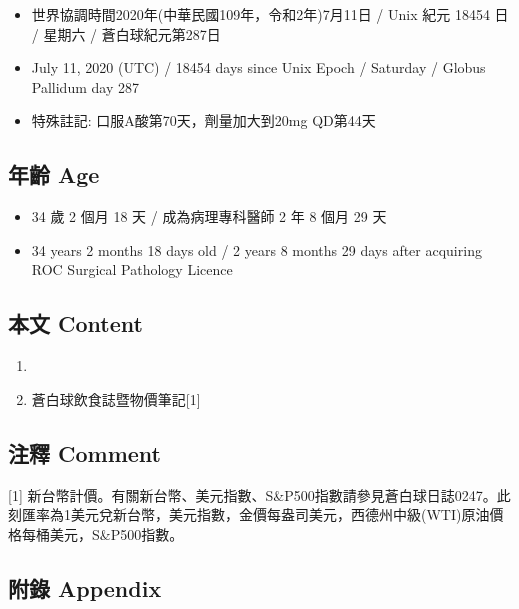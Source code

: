 \documentclass[
]{article}
\providecommand{\tightlist}{%
  \setlength{\itemsep}{0pt}\setlength{\parskip}{0pt}}
\begin{document}
\begin{itemize}
\tightlist
\item
  世界協調時間2020年(中華民國109年，令和2年)7月11日 / Unix 紀元 18454 日
  / 星期六 / 蒼白球紀元第287日
\item
  July 11, 2020 (UTC) / 18454 days since Unix Epoch / Saturday / Globus
  Pallidum day 287
\item
  特殊註記: 口服A酸第70天，劑量加大到20mg QD第44天
\end{itemize}

\hypertarget{ux5e74ux9f61-age-10}{%
\subsection{年齡 Age}\label{ux5e74ux9f61-age-10}}

\begin{itemize}
\tightlist
\item
  34 歲 2 個月 18 天 / 成為病理專科醫師 2 年 8 個月 29 天
\item
  34 years 2 months 18 days old / 2 years 8 months 29 days after
  acquiring ROC Surgical Pathology Licence
\end{itemize}

\hypertarget{ux672cux6587-content-10}{%
\subsection{本文 Content}\label{ux672cux6587-content-10}}

\begin{enumerate}
\def\labelenumi{\arabic{enumi}.}
\tightlist
\item
\item
  蒼白球飲食誌暨物價筆記{[}1{]}
\end{enumerate}

\hypertarget{ux6ce8ux91cb-comment-10}{%
\subsection{注釋 Comment}\label{ux6ce8ux91cb-comment-10}}

{[}1{]}
新台幣計價。有關新台幣、美元指數、S\&P500指數請參見蒼白球日誌0247。此刻匯率為1美元兌新台幣，美元指數，金價每盎司美元，西德州中級(WTI)原油價格每桶美元，S\&P500指數。

\hypertarget{ux9644ux9304-appendix-10}{%
\subsection{附錄 Appendix}\label{ux9644ux9304-appendix-10}}
\end{document}
